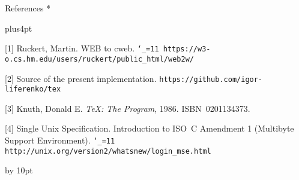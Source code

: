 \head * References *

\begingroup
\vskip-1pt

\frenchspacing
\parindent=0pt
\parskip=4pt plus4pt
\def\\{\hfil\break}
\everypar{\hangindent=1.5em\relax}
\raggedright

[1] Ruckert, Martin. WEB to cweb.\\
{\tt\catcode`_=11 https://w3-o.cs.hm.edu/users/ruckert/\\public_html/web2w/}

[2] Source of the present implementation.\\
{\tt https://github.com/igor-liferenko/tex}

[3] Knuth, Donald E. {\sl \TeX: The Program\/}, 1986. ISBN~0201134373.

[4] Single Unix Specification. Introduction to ISO~C Amendment 1
(Multibyte Support Environment).\\
{\tt\catcode`_=11 http://unix.org/version2/whatsnew/\\login_mse.html}

\par\endgroup

\advance\signaturewidth by 10pt
\makesignature
\endarticle
